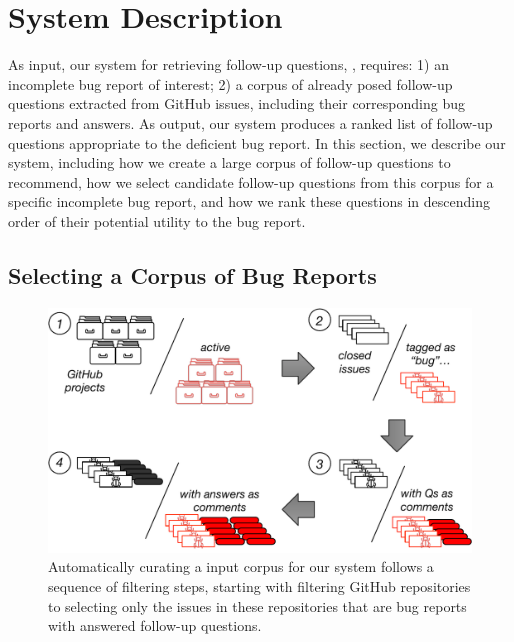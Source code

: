 \section{System Description}

As input, our system for retrieving follow-up questions, \evpi, requires: 1) an incomplete bug
report of interest; 2) a corpus of already posed follow-up questions extracted
from GitHub issues, including their corresponding bug reports and answers. As output, our system
produces a ranked list of follow-up questions appropriate to the deficient bug report.
In this section, we describe our system, including how we create
a large corpus of follow-up questions to recommend, how we select candidate follow-up questions from
this corpus for a specific incomplete bug report, and how we rank these questions in descending order of
their potential utility to the bug report.

\subsection{Selecting a Corpus of Bug Reports}


\begin{figure}[b]
\centering
\includegraphics[width=0.99\linewidth]{figures/pipeline.pdf}
\caption{Automatically curating a input corpus for our system follows a sequence of filtering steps, starting with filtering
GitHub repositories to selecting only the issues in these repositories that are bug reports with answered follow-up questions.}
\label{fig:pipeline}
\end{figure}

